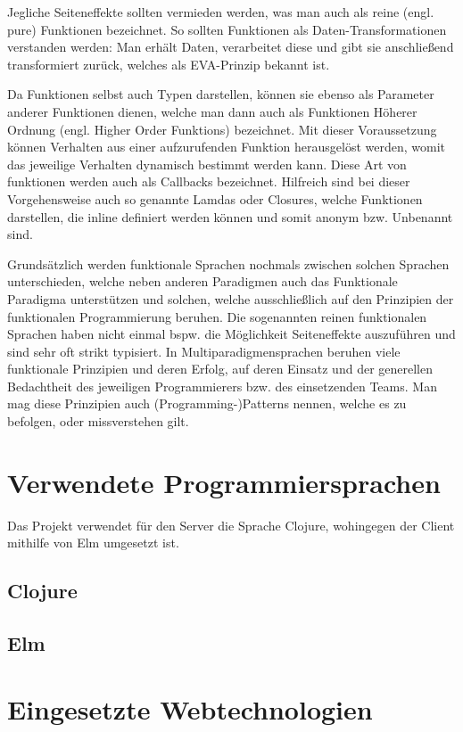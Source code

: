 Jegliche Seiteneffekte sollten vermieden werden, was man auch als reine (engl. pure) Funktionen bezeichnet.
So sollten Funktionen als Daten-Transformationen verstanden werden: Man erhält Daten, verarbeitet diese und gibt sie anschließend transformiert zurück, welches als \ac{EVA}-Prinzip bekannt ist.
\par
Da Funktionen selbst auch Typen darstellen, können sie ebenso als Parameter anderer Funktionen dienen, welche man dann auch als Funktionen Höherer Ordnung (engl. Higher Order Funktions) bezeichnet.
Mit dieser Voraussetzung können Verhalten aus einer aufzurufenden Funktion herausgelöst werden, womit das jeweilige Verhalten dynamisch bestimmt werden kann.
Diese Art von funktionen werden auch als Callbacks bezeichnet.
Hilfreich sind bei dieser Vorgehensweise auch so genannte Lamdas oder Closures, welche Funktionen darstellen, die inline definiert werden können und somit anonym \ac{bzw.} Unbenannt sind.
\par
Grundsätzlich werden funktionale Sprachen nochmals zwischen solchen Sprachen unterschieden, welche neben anderen Paradigmen auch das Funktionale Paradigma unterstützen und solchen, welche ausschließlich auf den Prinzipien der funktionalen Programmierung beruhen.
Die sogenannten reinen funktionalen Sprachen haben nicht einmal \ac{bspw.} die Möglichkeit Seiteneffekte auszuführen und sind sehr oft strikt typisiert.
In Multiparadigmensprachen beruhen viele funktionale Prinzipien und deren Erfolg, auf deren Einsatz und der generellen Bedachtheit des jeweiligen Programmierers \ac{bzw.} des einsetzenden Teams.
Man mag diese Prinzipien auch (Programming-)Patterns nennen, welche es zu befolgen, oder missverstehen gilt.

\section{Verwendete Programmiersprachen}
Das Projekt verwendet für den Server die Sprache Clojure, wohingegen der Client mithilfe von Elm umgesetzt ist.

\subsection{Clojure}

\subsection{Elm}

\section{Eingesetzte Webtechnologien}
